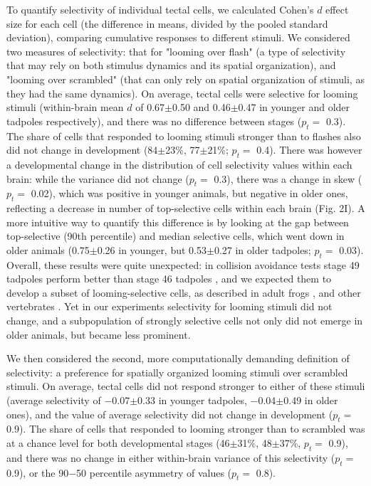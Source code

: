 \documentclass{article}
\begin{document}
To quantify selectivity of individual tectal cells, we calculated Cohen’s $d$ effect size for each cell (the difference in means, divided by the pooled standard deviation), comparing cumulative responses to different stimuli. We considered two measures of selectivity: that for "looming over flash" (a type of selectivity that may rely on both stimulus dynamics and its spatial organization), and "looming over scrambled" (that can only rely on spatial organization of stimuli, as they had the same dynamics). On average, tectal cells were selective for looming stimuli (within-brain mean $d$ of 0.67$\pm$0.50 and 0.46$\pm$0.47 in younger and older tadpoles respectively), and there was no difference between stages ($p_t=$ 0.3). The share of cells that responded to looming stimuli stronger than to flashes also did not change in development (84$\pm$23\%, 77$\pm$21\%; $p_t=$ 0.4). There was however a developmental change in the distribution of cell selectivity values within each brain: while the variance did not change ($p_t=$ 0.3), there was a change in skew ($p_t=$ 0.02), which was positive in younger animals, but negative in older ones, reflecting a decrease in number of top-selective cells within each brain (Fig. 2I). A more intuitive way to quantify this difference is by looking at the gap between top-selective (90th percentile) and median selective cells, which went down in older animals (0.75$\pm$0.26 in younger, but 0.53$\pm$0.27 in older tadpoles; $p_t=$ 0.03). Overall, these results were quite unexpected: in collision avoidance tests stage 49 tadpoles perform better than stage 46 tadpoles \citep{dong2009}, and we expected them to develop a subset of looming-selective cells, as described in adult frogs \citep{nakagawa2010otneurons,baranauskas2012}, and other vertebrates \citep{wang1992pigeon,wu2005pigeon,liu2011cat}. Yet in our experiments selectivity for looming stimuli did not change, and a subpopulation of strongly selective cells not only did not emerge in older animals, but became less prominent.

We then considered the second, more computationally demanding definition of selectivity: a preference for spatially organized looming stimuli over scrambled stimuli. On average, tectal cells did not respond stronger to either of these stimuli (average selectivity of $-$0.07$\pm$0.33 in younger tadpoles, $-$0.04$\pm$0.49 in older ones), and the value of average selectivity did not change in development ($p_t=$ 0.9). The share of cells that responded to looming stronger than to scrambled was at a chance level for both developmental stages (46$\pm$31\%, 48$\pm$37\%, $p_t=$ 0.9), and there was no change in either within-brain variance of this selectivity ($p_t=$ 0.9), or the 90$-$50 percentile asymmetry of values ($p_t=$ 0.8).
\end{document}
